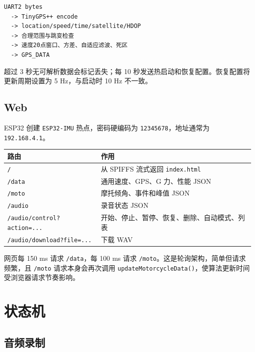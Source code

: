 \documentclass[
  UTF8,11pt,a4paper]{ctexart}
\newcommand{\passthrough}[1]{#1}
\newcounter{none} %
\begin{document}
\begin{lstlisting}
UART2 bytes
  -> TinyGPS++ encode
  -> location/speed/time/satellite/HDOP
  -> 合理范围与跳变检查
  -> 速度20点窗口、方差、自适应滤波、死区
  -> GPS_DATA
\end{lstlisting}

超过 3 秒无可解析数据会标记丢失；每 10
秒发送热启动和恢复配置。恢复配置将更新周期设置为 5 Hz，与启动时 10 Hz
不一致。

\subsection{Web}\label{web}

ESP32 创建 \passthrough{\lstinline!ESP32-IMU!} 热点，密码硬编码为
\passthrough{\lstinline!12345678!}，地址通常为
\passthrough{\lstinline!192.168.4.1!}。

{\def\LTcaptype{none} %
\begin{longtable}[]{@{}ll@{}}
\toprule\noalign{}
路由 & 作用 \\
\midrule\noalign{}
\endhead
\bottomrule\noalign{}
\endlastfoot
\passthrough{\lstinline!/!} & 从 SPIFFS 流式返回
\passthrough{\lstinline!index.html!} \\
\passthrough{\lstinline!/data!} & 通用速度、GPS、G 力、性能 JSON \\
\passthrough{\lstinline!/moto!} & 摩托倾角、事件和峰值 JSON \\
\passthrough{\lstinline!/audio!} & 录音状态 JSON \\
\passthrough{\lstinline!/audio/control?action=...!} &
开始、停止、暂停、恢复、删除、自动模式、列表 \\
\passthrough{\lstinline!/audio/download?file=...!} & 下载 WAV \\
\end{longtable}
}

网页每 150 ms 请求 \passthrough{\lstinline!/data!}，每 100 ms 请求
\passthrough{\lstinline!/moto!}。这是轮询架构，简单但请求频繁，且
\passthrough{\lstinline!/moto!} 请求本身会再次调用
\passthrough{\lstinline!updateMotorcycleData()!}，使算法更新时间受浏览器请求节奏影响。

\section{状态机}\label{ux72b6ux6001ux673a}

\subsection{音频录制}\label{ux97f3ux9891ux5f55ux5236}
\end{document}
